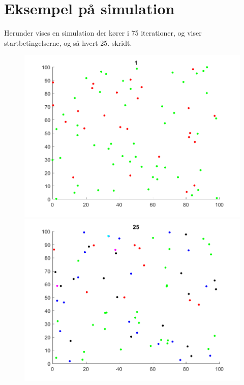 \documentclass[a4paper,10pt]{article} 	%
\numberwithin{equation}{section}
\begin{document}
	\section{Eksempel på simulation}
	Herunder vises en simulation der kører i 75 iterationer, og viser startbetingelserne, og så hvert 25. skridt.
	\begin{figure}[H]
		\centering
		\begin{minipage}{0.45\textwidth}
			\centering
			\includegraphics[width=\textwidth]{img/plot1.png}
		\end{minipage}
		\begin{minipage}{0.45\textwidth}
			\centering
			\includegraphics[width=\textwidth]{img/plot2.png}
		\end{minipage}

\end{figure}
\end{document}
